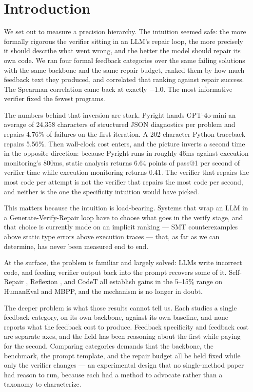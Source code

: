 \section{Introduction}

We set out to measure a precision hierarchy. The intuition seemed safe: the more formally rigorous the verifier sitting in an LLM's repair loop, the more precisely it should describe what went wrong, and the better the model should repair its own code. We ran four formal feedback categories over the same failing solutions with the same backbone and the same repair budget, ranked them by how much feedback text they produced, and correlated that ranking against repair success. The Spearman correlation came back at exactly $-1.0$. The most informative verifier fixed the fewest programs.

The numbers behind that inversion are stark. Pyright hands GPT-4o-mini an average of 24,358 characters of structured JSON diagnostics per problem and repairs 4.76\% of failures on the first iteration. A 202-character Python traceback repairs 5.56\%. Then wall-clock cost enters, and the picture inverts a second time in the opposite direction: because Pyright runs in roughly 46ms against execution monitoring's 800ms, static analysis returns 6.64 points of pass@1 per second of verifier time while execution monitoring returns 0.41. The verifier that repairs the most code per attempt is not the verifier that repairs the most code per second, and neither is the one the specificity intuition would have picked.

This matters because the intuition is load-bearing. Systems that wrap an LLM in a Generate-Verify-Repair loop have to choose what goes in the verify stage, and that choice is currently made on an implicit ranking --- SMT counterexamples above static type errors above execution traces --- that, as far as we can determine, has never been measured end to end.

At the surface, the problem is familiar and largely solved: LLMs write incorrect code, and feeding verifier output back into the prompt recovers some of it. Self-Repair \cite{Olausson2023SelfRepair}, Reflexion \cite{Shinn2023Reflexion}, and CodeT \cite{Chen2022CodeT} all establish gains in the 5--15\% range on HumanEval and MBPP, and the mechanism is no longer in doubt.

The deeper problem is what those results cannot tell us. Each studies a single feedback category, on its own backbone, against its own baseline, and none reports what the feedback cost to produce. Feedback specificity and feedback cost are separate axes, and the field has been reasoning about the first while paying for the second. Comparing categories demands that the backbone, the benchmark, the prompt template, and the repair budget all be held fixed while only the verifier changes --- an experimental design that no single-method paper had reason to run, because each had a method to advocate rather than a taxonomy to characterize.

